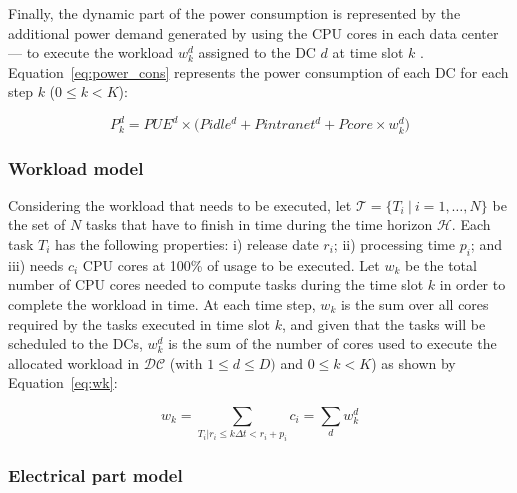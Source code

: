 Finally, the dynamic part of the power consumption is represented by the additional power demand generated by using the CPU cores in each data center --- to execute the workload $ w^d_k$ assigned to the DC $d$ at time slot $k$ . Equation~\eqref{eq:power_cons} represents the power consumption of each DC for each step $k$ ($0\leq k<K$):

\begin{equation} \label{eq:power_cons}
   P^d_k  = PUE^d \times \big( Pidle^d + Pintranet^d + Pcore \times w^d_k\big)
\end{equation}



\subsubsection{Workload model}

Considering the workload that needs to be executed, let $\mathcal{T} = \{T_i \ | \ i=1, \ldots, N\}$ be the set of $N$ tasks that have to finish in time during the time horizon $\mathcal{H}$. Each task $T_i$ has the following properties: i) release date $r_i$; ii)  processing time $p_i$;  and iii) needs $c_i$ CPU cores at 100\% of usage to be executed. Let $w_k$ be the total number of CPU cores needed to compute tasks during the time slot $k$ in order to complete the workload in time. At each time step, $w_k$ is the sum over all cores required by the tasks executed in time slot $k$, and given that the tasks will be scheduled to the DCs,  $w_k^d$ is the sum of the number of cores used to execute the allocated workload in $\mathcal{DC}$ (with $1\leq d\leq D)$ and $0\leq k<K$) as shown by Equation~\eqref{eq:wk}:

\begin{equation} \label{eq:wk}
    w_k = \sum_{T_i|r_i\leq k\Delta t<r_i+p_i} c_i = \sum_d w_k^d
\end{equation}


\subsubsection{Electrical part model}

